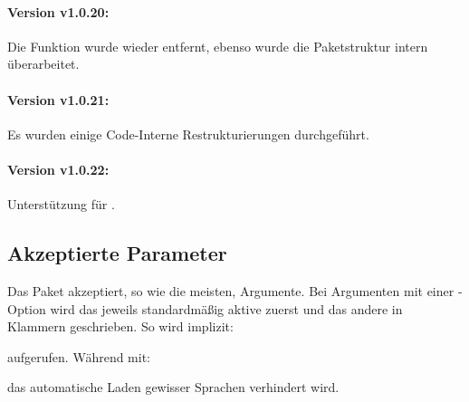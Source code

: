\documentclass{sopra-base}
\begin{document}
\paragraph{Version v1.0.20:}
Die Funktion  wurde wieder entfernt, ebenso wurde die Paketstruktur intern überarbeitet.
\paragraph{Version v1.0.21:}
Es wurden einige Code-Interne Restrukturierungen durchgeführt.
\paragraph{Version v1.0.22:}
Unterstützung für .


%
%
%
%

\subsection{Akzeptierte Parameter}
    Das Paket akzeptiert, so wie die meisten, Argumente.
    Bei Argumenten mit einer -Option wird das jeweils standardmäßig aktive zuerst und das andere in Klammern
    geschrieben. So wird implizit:
\begin{plainlatex}
\usepackage[noencoding,hlnumbers,loadlangs,guardspace]{sopra-listings}
\end{plainlatex}
    aufgerufen. Während mit:
\begin{plainlatex}
\usepackage[noloadlangs]{sopra-listings}
\end{plainlatex}
    das automatische Laden gewisser Sprachen verhindert wird.
\end{document}
